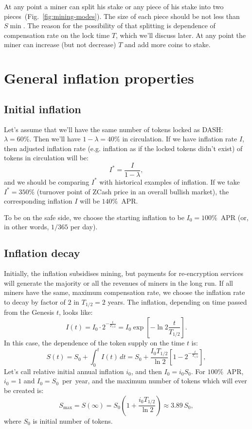 \documentclass[longbibliography,nofootinbib,twocolumn]{revtex4-1}
\newcommand{\figref}[1]{Fig.~\ref{#1}}
\begin{document}
At any point a miner can split his stake or any piece of his stake into two pieces~(\figref{fig:mining-modes}).
The size of each piece should be not less than $S{\min}$.
The reason for the possibility of that splitting is dependence of compensation rate on the lock time $T$, which we'll discuss later.
At any point the miner can increase (but not decrease) $T$ and add more coins to stake.

\section{General inflation properties}

\subsection{Initial inflation}

Let's assume that we'll have the same number of tokens locked as DASH: $\lambda=60\%$.
Then we'll have $1-\lambda=40\%$ in circulation.
If we have inflation rate $I$, then adjusted inflation rate (e.g. inflation as if the locked tokens didn't exist) of tokens in circulation will be:
\begin{equation}
    I^* = \frac{I}{1-\lambda},
\end{equation}
and we should be comparing $I^*$ with historical examples of inflation.
If we take $I^*=350\%$ (turnover point of ZCash price in an overall bullish market), the corresponding inflation $I$ will be $140\%$~APR.

To be on the safe side, we choose the starting inflation to be $I_0=100\%$~APR (or, in other words, $1/365$ per day).

\subsection{Inflation decay}

Initially, the inflation subsidises mining, but payments for re-encryption services will generate the majority or all the revenues of miners in the long run.
If all miners have the same, maximum compensation rate, we choose the inflation rate to decay by factor of $2$ in $T_{1/2} = 2$ years.
The inflation, depending on time passed from the Genesis $t$, looks like:
\begin{equation}
    I(t) = I_0 \cdot 2^{-\frac{t}{T_{1/2}}} = I_0 \exp\left[ -\ln{2} \frac{t}{T_{1/2}} \right].
\end{equation}
In this case, the dependence of the token supply on the time $t$ is:
\begin{equation}
    \label{eq:supply-time}
    S(t) = S_0 + \int_0^{t} I(t)\, dt = S_0 + \frac{I_0 T_{1/2}}{\ln{2}}\left[1 - 2^{-\frac{t}{T_{1/2}}} \right],
\end{equation}
Let's call relative initial annual inflation $i_0$, and then $I_0 = i_0 S_0$.
For $100\%$~APR, $i_0=1$ and $I_0=S_0$~per~year, and the maximum number of tokens which will ever be created is:
\begin{equation}
    S_{\max} = S(\infty) = S_0\left(1 + \frac{i_0 T_{1/2}}{\ln{2}}\right) \approx 3.89\, S_0,
\end{equation}
where $S_0$ is initial number of tokens.
\end{document}
